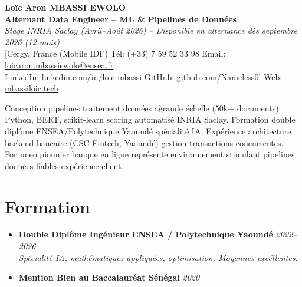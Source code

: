 \documentclass[a4paper,11pt]{article}
\begin{document}
\begin{center}
    {\Large \textbf{Lo\"ic Aron MBASSI EWOLO}} \\ \vspace{4pt}
    \textbf{\large Alternant Data Engineer -- ML \& Pipelines de Donn\'ees} \\
    \textit{\small Stage INRIA Saclay (Avril--Ao\^ut 2026) -- Disponible en alternance d\`es septembre 2026 (12 mois)} \\ \vspace{4pt}
    \small
    [Cergy, France (Mobile IDF) \quad
    Tél: (+33) 7 59 52 33 98 \quad
    {\color{primary}Email: \href{mailto:loicaron.mbassiewolo@ensea.fr}{loicaron.mbassiewolo@ensea.fr}} \\ \vspace{2pt}
    {\color{primary}LinkedIn: \href{https://www.linkedin.com/in/loic-mbassi/}{linkedin.com/in/loic-mbassi}} \quad
    {\color{primary}GitHub: \href{https://github.com/Nameless0l}{github.com/Nameless0l}} \quad
    {\color{primary}Web: \href{https://mbassiloic.tech}{mbassiloic.tech}}
\end{center}
\vspace{-6pt}
\noindent\small{Conception pipelines traitement donn\'ees a\` grande \'echelle (50k+ documents) Python, BERT, scikit-learn scoring automatisé INRIA Saclay. Formation double dipl\^ome ENSEA/Polytechnique Yaound\'e sp\'ecialit\'e IA. Exp\'erience architecture backend bancaire (CSC Fintech, Yaound\'e) gestion transactions concurrentes. Fortuneo pionnier banque en ligne repr\'esente environnement stimulant pipelines donn\'ees fiables exp\'erience client.}

\section{Formation}
\begin{itemize}[leftmargin=0.5cm, nosep]
    \item \textbf{Double Dipl\^ome Ing\'enieur ENSEA / Polytechnique Yaound\'e} \hfill \textit{2022--2026} \\
    \textit{Sp\'ecialit\'e IA, math\'ematiques appliqu\'ees, optimisation. Moyennes exc\'ellentes.}
    \item \textbf{Mention Bien au Baccalaur\'eat S\'en\'egal} \hfill \textit{2020}
\end{itemize}
\end{document}
